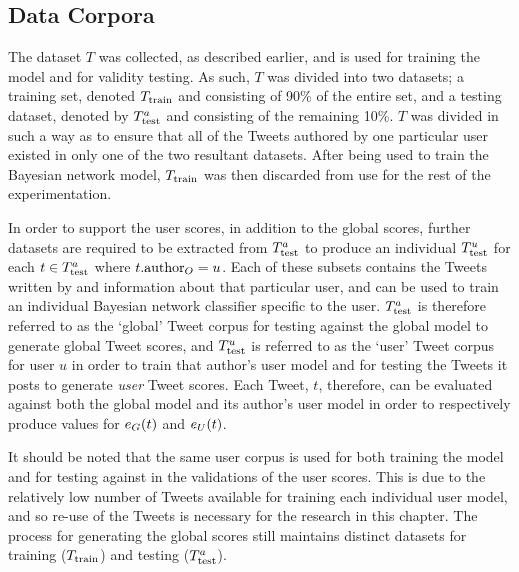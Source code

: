 \subsection{Data Corpora}
The dataset $T$ was collected, as described earlier, and is used for training the model and for validity testing. As such, $T$  was divided into two datasets; a training set, denoted $T_{\textrm{train}}{}$ and consisting of 90\% of the entire set, and a testing dataset, denoted by $T^a_{\textrm{test}}{}$ and consisting of the remaining 10\%. $T$ was divided in such a way as to ensure that all of the Tweets authored by one particular user existed in only one of the two resultant datasets. After being used to train the Bayesian network model, $T_{\textrm{train}}{}$ was then discarded from use for the rest of the experimentation.

In order to support the user scores, in addition to the global scores, further datasets are required to be extracted from $T^a_{\textrm{test}}{}$ to produce an individual $T_{\textrm{test}}^u$ for each $t \in T^a_{\textrm{test}}{}$ where $t.\textrm{author}_O = u$. Each of these subsets contains the Tweets written by and information about that particular user, and can be used to train an individual Bayesian network classifier specific to the user. $T^a_{\textrm{test}}{}$ is therefore referred to as the `global' Tweet corpus for testing against the global model to generate global Tweet scores, and $T_{\textrm{test}}^u$ is referred to as the `user' Tweet corpus for user $u$ in order to train that author's user model and for testing the Tweets it posts to generate \textit{user} Tweet scores. Each Tweet, $t$, therefore, can be evaluated against both the global model and its author's user model in order to respectively produce values for $e_G(t)$ and $e_U(t)$.

It should be noted that the same user corpus is used for both training the model and for testing against in the validations of the user scores. This is due to the relatively low number of Tweets available for training each individual user model, and so re-use of the Tweets is necessary for the research in this chapter. The process for generating the global scores still maintains distinct datasets for training ($T_{\textrm{train}}{}$) and testing ($T^a_{\textrm{test}}{}$).


